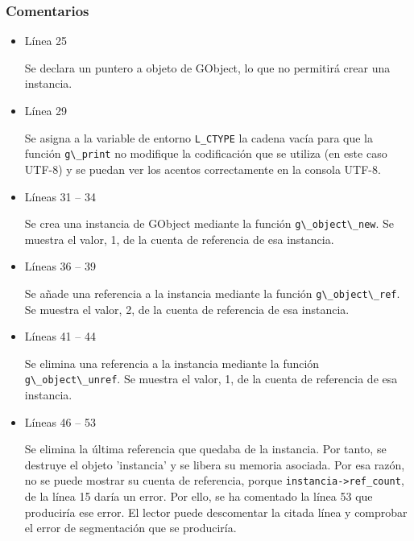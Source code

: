 \subsubsection{Comentarios}
\begin{itemize}
\item Línea 25\par
  Se declara un puntero a objeto de \textsf{GObject}, lo que no permitirá crear una instancia.
\item Línea 29\par
  Se asigna a la variable de entorno \texttt{L\_CTYPE} la cadena vacía para que la función
  \passthrough{\lstinline!g\_print!} no modifique la codificación que se utiliza (en este caso UTF-8)
  y se puedan ver los acentos correctamente en la consola UTF-8.
\item Líneas 31 -- 34\par
  Se crea una instancia de \textsf{GObject} mediante la función \passthrough{\lstinline!g\_object\_new!}.
  Se muestra el valor, 1,  de la cuenta de referencia de esa instancia.
\item Líneas 36 -- 39\par
  Se añade una referencia a la instancia mediante la función  \passthrough{\lstinline!g\_object\_ref!}.
  Se muestra el valor, 2,  de la cuenta de referencia de esa instancia.
\item Líneas 41 -- 44\par
  Se elimina una referencia a la instancia mediante la función  \passthrough{\lstinline!g\_object\_unref!}.
  Se muestra el valor, 1,  de la cuenta de referencia de esa instancia.
\item Líneas 46 -- 53\par
  Se elimina la  última referencia que quedaba de la instancia.
  Por tanto, se destruye el objeto 'instancia' y se libera su memoria asociada.
  Por esa razón, no se puede mostrar su cuenta de referencia, porque
  \passthrough{\lstinline!instancia->ref_count!}, de la línea 15 daría un error.
  Por ello, se ha comentado la línea 53 que produciría ese error.
  El lector puede descomentar la citada línea y comprobar el error de segmentación que se produciría.
  \end{itemize}












